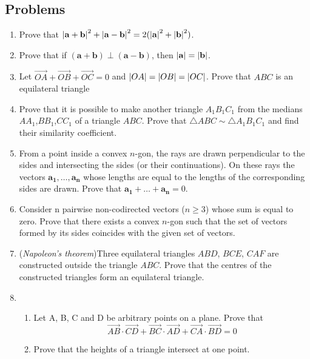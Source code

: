 \documentclass{article}
\begin{document}
\subsection{Problems}
\begin{enumerate}
\item
Prove that $\abs{\mathbf{a} + \mathbf{b}}^2 + \abs{\mathbf{a} - \mathbf{b}}^2 = 2(\abs{\mathbf{a}}^2 + \abs{\mathbf{b}}^2)$.

\item
Prove that if $(\mathbf{a}+\mathbf{b}) \perp (\mathbf{a}-\mathbf{b})$, then $\abs{\mathbf{a}} = \abs{\mathbf{b}}$.

\item 
Let $\overrightarrow{OA} + \overrightarrow{OB} + \overrightarrow{OC} = 0$ and $\abs{OA}=\abs{OB}=\abs{OC}$. Prove that $ABC$ is an equilateral triangle

\item %
Prove that it is possible to make another triangle $A_1B_1C_1$ from the medians $AA_1$,$BB_1$,$CC_1$ of a triangle $ABC$. Prove that $\triangle ABC \sim \triangle A_1B_1C_1$ and find their similarity coefficient. 

\item %
From a point inside a convex $n$-gon, the rays are drawn perpendicular to the sides and intersecting the sides (or their continuations). On these rays the vectors $\mathbf{a_1}, \dots , \mathbf{a_n}$ whose lengths are equal to the lengths of the corresponding sides are drawn. Prove that
$\mathbf{a_1} + \dots + \mathbf{a_n} = 0$.


\item %
Consider n pairwise non-codirected vectors ($n \geq 3$) whose sum is equal to zero. Prove that there exists a convex $n$-gon such that the set of vectors formed by its sides coincides with the given set of vectors.

\item %
(\emph{Napoleon's theorem})Three equilateral triangles $ABD$, $BCE$, $CAF$ are constructed outside the triangle $ABC$. Prove that the centres of the constructed triangles form an equilateral triangle. 

\item %
\begin{enumerate}
\item Let A, B, C and D be arbitrary points on a plane. Prove that
$$ \overrightarrow{AB} \cdot \overrightarrow{CD} +
\overrightarrow{BC} \cdot \overrightarrow{AD} +
\overrightarrow{CA} \cdot \overrightarrow{BD} = 0
 $$
\item Prove that the heights of a triangle intersect at one point.	
\end{enumerate}


\end{enumerate}
\end{document}
